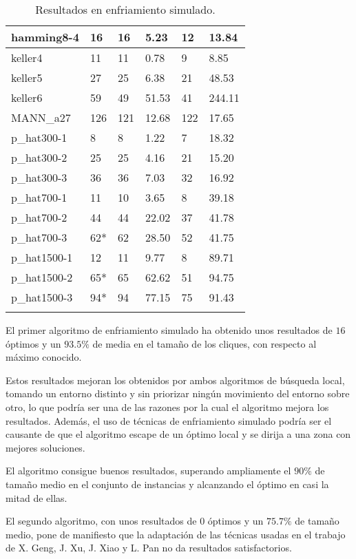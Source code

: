 \begin{small}
\begin{longtable}{l l l l l l}
    hamming8-4         & 16 & 16 & 5.23 & 12 & 13.84 \\ \hline
    keller4            & 11 & 11 & 0.78 & 9 & 8.85 \\ \hline
    keller5            & 27 & 25 & 6.38 & 21 & 48.53 \\ \hline
    keller6            & 59 & 49 & 51.53 & 41 & 244.11 \\ \hline
    MANN\_a27          & 126 & 121 & 12.68 & 122 & 17.65 \\ \hline
    p\_hat300-1        & 8 & 8 & 1.22 & 7 & 18.32 \\ \hline
    p\_hat300-2        & 25 & 25 & 4.16 & 21 & 15.20 \\ \hline
    p\_hat300-3        & 36 & 36 & 7.03 & 32 & 16.92 \\ \hline
    p\_hat700-1        & 11 & 10 & 3.65 & 8 & 39.18 \\ \hline
    p\_hat700-2        & 44 & 44 & 22.02 & 37 & 41.78 \\ \hline
    p\_hat700-3        & 62* & 62 & 28.50 & 52 & 41.75 \\ \hline
    p\_hat1500-1       & 12 & 11 & 9.77 & 8 & 89.71 \\ \hline
    p\_hat1500-2       & 65* & 65 & 62.62 & 51 & 94.75 \\ \hline
    p\_hat1500-3       & 94* & 94 & 77.15 & 75 & 91.43 \\ \hline
  \caption{Resultados en enfriamiento simulado.}
\end{longtable}
\end{small}

El primer algoritmo de enfriamiento simulado ha obtenido unos resultados de $16$
óptimos y un $93.5\%$ de media en el tamaño de los cliques, con respecto al máximo
conocido.

Estos resultados mejoran los obtenidos por ambos algoritmos de búsqueda local,
tomando un entorno distinto y sin priorizar  ningún movimiento del entorno sobre
otro, lo que podría ser una de las razones por la cual el algoritmo mejora los resultados.
Además, el uso de técnicas de enfriamiento simulado podría ser el causante de que
el algoritmo escape de un óptimo local y se dirija a una zona con mejores soluciones.

El algoritmo consigue buenos resultados, superando ampliamente el $90\%$ de tamaño
medio en el conjunto de instancias y alcanzando el óptimo en casi la mitad de ellas.

El segundo algoritmo, con unos resultados de $0$ óptimos y un $75.7\%$ de tamaño
medio, pone de manifiesto que la adaptación de las técnicas usadas en el trabajo de
X. Geng, J. Xu, J. Xiao y L. Pan no da resultados satisfactorios.

